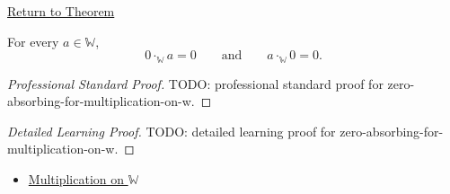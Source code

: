 \newpage
{}
\label{prf:zero-absorbing-for-multiplication-on-w}

\begin{remark*}[Return]
\hyperref[thm:zero-absorbing-for-multiplication-on-w]{Return to Theorem}
\end{remark*}

\begin{theorem*}
For every $a\in\mathbb{W}$,
\[
0\cdot_{\mathbb{W}}a=0
\qquad\text{and}\qquad
a\cdot_{\mathbb{W}}0=0.
\]
\end{theorem*}

\begin{proof}[Professional Standard Proof]
\LRAProofBodyStart
TODO: professional standard proof for zero-absorbing-for-multiplication-on-w.
\end{proof}

\begin{proof}[Detailed Learning Proof]
\LRAProofBodyStart
TODO: detailed learning proof for zero-absorbing-for-multiplication-on-w.
\end{proof}

\begin{remark*}
\end{remark*}

\begin{dependencies}
\begin{itemize}
  \item \hyperref[def:multiplication-on-w]{Multiplication on $\mathbb{W}$}
\end{itemize}
\end{dependencies}

\clearpage

